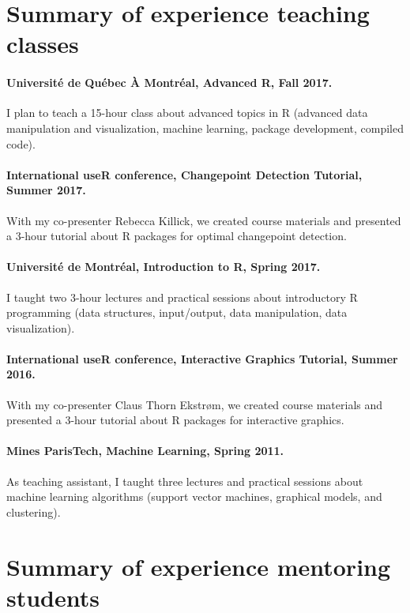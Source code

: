 \documentclass{article}
\begin{document}
\section{Summary of experience teaching classes} 

\paragraph{Universit\'e de Qu\'ebec \`A Montr\'eal, Advanced R, Fall
  2017.} I plan to teach a 15-hour class about advanced topics in R
(advanced data manipulation and visualization, machine learning, 
package development, compiled code).

\paragraph{International useR conference, Changepoint Detection
  Tutorial, Summer 2017.} With my co-presenter Rebecca Killick, we
created course materials and presented a 3-hour tutorial about R
packages for optimal changepoint detection. 

\paragraph{Universit\'e de Montr\'eal, Introduction to R, Spring
  2017.} I taught two 3-hour lectures and practical sessions about
introductory R programming (data structures, input/output, data
manipulation, data visualization).

\paragraph{International useR conference, Interactive Graphics
  Tutorial, Summer 2016.} With my co-presenter Claus Thorn Ekstr\o m,
we created course materials and presented a 3-hour tutorial about R
packages for interactive graphics.

\paragraph{Mines ParisTech, Machine Learning, Spring 2011.} As
teaching assistant, I taught three lectures and practical sessions
about machine learning algorithms (support vector machines, graphical
models, and clustering).

\section{Summary of experience mentoring students}
\end{document}
